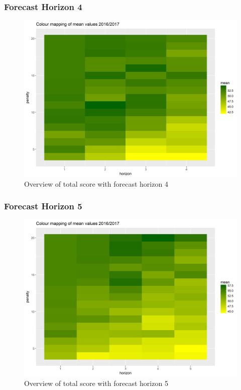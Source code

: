 \subsubsection{Forecast Horizon 4}

\begin{figure}[H]
    \centering
    \includegraphics[scale=0.55]{fig/chapter_6/paramter_choice_4.png}
    \caption{Overview of total score with forecast horizon 4}
\label{fig:parameters_f_hor_4}    
\end{figure}

\subsubsection{Forecast Horizon 5}

\begin{figure}[H]
    \centering
    \includegraphics[scale=0.55]{fig/chapter_6/paramter_choice_5.png}
    \caption{Overview of total score with forecast horizon 5}
\label{fig:parameters_f_hor_5}    
\end{figure}

